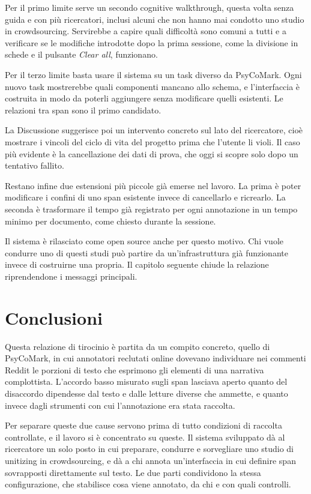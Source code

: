 \documentclass[]{sapthesis}
\begin{document}
Per il primo limite serve un secondo cognitive walkthrough, questa volta senza guida e con più ricercatori, inclusi alcuni che non hanno mai condotto uno studio in crowdsourcing. Servirebbe a capire quali difficoltà sono comuni a tutti e a verificare se le modifiche introdotte dopo la prima sessione, come la divisione in schede e il pulsante \emph{Clear all}, funzionano.

Per il terzo limite basta usare il sistema su un task diverso da PsyCoMark. Ogni nuovo task mostrerebbe quali componenti mancano allo schema, e l'interfaccia è costruita in modo da poterli aggiungere senza modificare quelli esistenti. Le relazioni tra span sono il primo candidato.

La Discussione suggerisce poi un intervento concreto sul lato del ricercatore, cioè mostrare i vincoli del ciclo di vita del progetto prima che l'utente li violi. Il caso più evidente è la cancellazione dei dati di prova, che oggi si scopre solo dopo un tentativo fallito.

Restano infine due estensioni più piccole già emerse nel lavoro. La prima è poter modificare i confini di uno span esistente invece di cancellarlo e ricrearlo. La seconda è trasformare il tempo già registrato per ogni annotazione in un tempo minimo per documento, come chiesto durante la sessione.

Il sistema è rilasciato come open source anche per questo motivo. Chi vuole condurre uno di questi studi può partire da un'infrastruttura già funzionante invece di costruirne una propria. Il capitolo seguente chiude la relazione riprendendone i messaggi principali.

\chapter{Conclusioni}
\label{chap:conclusioni}

Questa relazione di tirocinio è partita da un compito concreto, quello di PsyCoMark, in cui annotatori reclutati online dovevano individuare nei commenti Reddit le porzioni di testo che esprimono gli elementi di una narrativa complottista. L'accordo basso misurato sugli span lasciava aperto quanto del disaccordo dipendesse dal testo e dalle letture diverse che ammette, e quanto invece dagli strumenti con cui l'annotazione era stata raccolta.

Per separare queste due cause servono prima di tutto condizioni di raccolta controllate, e il lavoro si è concentrato su queste. Il sistema sviluppato dà al ricercatore un solo posto in cui preparare, condurre e sorvegliare uno studio di unitizing in crowdsourcing, e dà a chi annota un'interfaccia in cui definire span sovrapposti direttamente sul testo. Le due parti condividono la stessa configurazione, che stabilisce cosa viene annotato, da chi e con quali controlli.
\end{document}
